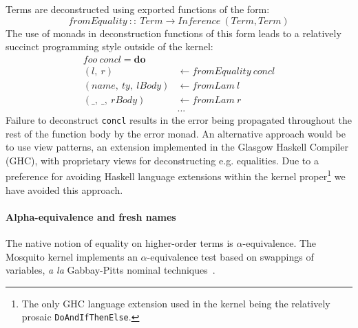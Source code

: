 \documentclass{llncs}
\begin{document}
Terms are deconstructed using exported functions of the form:
\begin{displaymath}
fromEquality\ ::\ Term \rightarrow Inference\ (Term, Term)
\end{displaymath}
The use of monads in deconstruction functions of this form leads to a relatively succinct programming style outside of the kernel:
\begin{displaymath}
\begin{aligned}
foo\ concl = \mathbf{do} & \\
    (l,\ r)            & \leftarrow fromEquality\ concl \\
    (name,\ ty,\ lBody) & \leftarrow fromLam\ l \\
    (\_,\   \_,\ rBody) & \leftarrow fromLam\ r \\
    & ...
\end{aligned}
\end{displaymath}
Failure to deconstruct \texttt{concl} results in the error being propagated throughout the rest of the function body by the error monad.
An alternative approach would be to use view patterns, an extension implemented in the Glasgow Haskell Compiler (GHC), with proprietary views for deconstructing e.g. equalities.
Due to a preference for avoiding Haskell language extensions within the kernel proper\footnote{The only GHC language extension used in the kernel being the relatively prosaic \texttt{DoAndIfThenElse}.} we have avoided this approach.

\paragraph{Alpha-equivalence and fresh names}
The native notion of equality on higher-order terms is $\alpha$-equivalence.
The Mosquito kernel implements an $\alpha$-equivalence test based on swappings of variables, \emph{a la} Gabbay-Pitts nominal techniques~\cite{gabbay:new:1999}.
\end{document}
